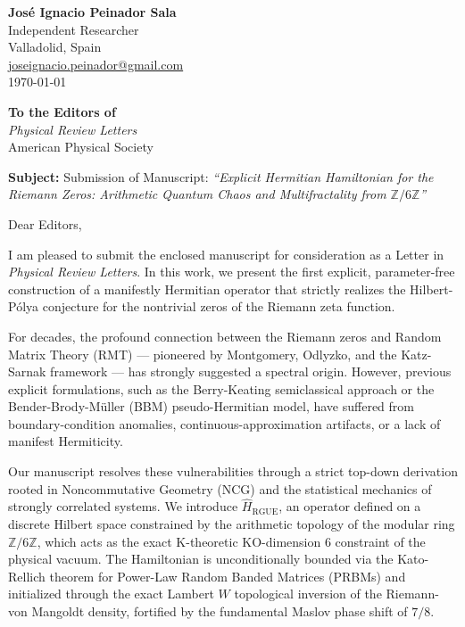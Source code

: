 \documentclass[11pt,a4paper]{article}
\begin{document}
\pagestyle{empty} %

\begin{flushright}
    \textbf{José Ignacio Peinador Sala}\\
    Independent Researcher\\
    Valladolid, Spain\\
    \href{mailto:joseignacio.peinador@gmail.com}{joseignacio.peinador@gmail.com}\\
    \vspace{0.5cm}
    \today
\end{flushright}

\vspace{1cm}

\textbf{To the Editors of}\\
\textit{Physical Review Letters}\\
American Physical Society

\vspace{0.5cm}

\textbf{Subject:} Submission of Manuscript: \textit{``Explicit Hermitian Hamiltonian for the Riemann Zeros: Arithmetic Quantum Chaos and Multifractality from $\mathbb{Z}/6\mathbb{Z}$''}

\vspace{0.5cm}

Dear Editors,

I am pleased to submit the enclosed manuscript for consideration as a Letter in \textit{Physical Review Letters}. In this work, we present the first explicit, parameter-free construction of a manifestly Hermitian operator that strictly realizes the Hilbert-P\'olya conjecture for the nontrivial zeros of the Riemann zeta function.

For decades, the profound connection between the Riemann zeros and Random Matrix Theory (RMT) --- pioneered by Montgomery, Odlyzko, and the Katz-Sarnak framework --- has strongly suggested a spectral origin. However, previous explicit formulations, such as the Berry-Keating semiclassical approach or the Bender-Brody-M\"uller (BBM) pseudo-Hermitian model, have suffered from boundary-condition anomalies, continuous-approximation artifacts, or a lack of manifest Hermiticity.

Our manuscript resolves these vulnerabilities through a strict top-down derivation rooted in Noncommutative Geometry (NCG) and the statistical mechanics of strongly correlated systems. We introduce $\hat{H}_{\text{RGUE}}$, an operator defined on a discrete Hilbert space constrained by the arithmetic topology of the modular ring $\mathbb{Z}/6\mathbb{Z}$, which acts as the exact K-theoretic KO-dimension 6 constraint of the physical vacuum. The Hamiltonian is unconditionally bounded via the Kato-Rellich theorem for Power-Law Random Banded Matrices (PRBMs) and initialized through the exact Lambert $W$ topological inversion of the Riemann-von Mangoldt density, fortified by the fundamental Maslov phase shift of $7/8$.
\end{document}
